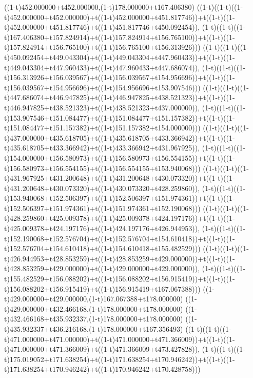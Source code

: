 ((1-t)452.000000+t452.000000,(1-t)178.000000+t167.406380)
((1-t)((1-t)((1-t)452.000000+t452.000000)+t((1-t)452.000000+t451.817746))+t((1-t)((1-t)452.000000+t451.817746)+t((1-t)451.817746+t450.092454)),                                     (1-t)((1-t)((1-t)167.406380+t157.824914)+t((1-t)157.824914+t156.765100))+t((1-t)((1-t)157.824914+t156.765100)+t((1-t)156.765100+t156.313926)))
((1-t)((1-t)((1-t)450.092454+t449.043304)+t((1-t)449.043304+t447.960433))+t((1-t)((1-t)449.043304+t447.960433)+t((1-t)447.960433+t447.686074)),                                     (1-t)((1-t)((1-t)156.313926+t156.039567)+t((1-t)156.039567+t154.956696))+t((1-t)((1-t)156.039567+t154.956696)+t((1-t)154.956696+t153.907546)))
((1-t)((1-t)((1-t)447.686074+t446.947825)+t((1-t)446.947825+t438.521323))+t((1-t)((1-t)446.947825+t438.521323)+t((1-t)438.521323+t437.000000)),                                     (1-t)((1-t)((1-t)153.907546+t151.084477)+t((1-t)151.084477+t151.157382))+t((1-t)((1-t)151.084477+t151.157382)+t((1-t)151.157382+t154.000000)))
((1-t)((1-t)((1-t)437.000000+t435.618705)+t((1-t)435.618705+t433.366942))+t((1-t)((1-t)435.618705+t433.366942)+t((1-t)433.366942+t431.967925)),                                     (1-t)((1-t)((1-t)154.000000+t156.580973)+t((1-t)156.580973+t156.554155))+t((1-t)((1-t)156.580973+t156.554155)+t((1-t)156.554155+t153.940068)))
((1-t)((1-t)((1-t)431.967925+t431.200648)+t((1-t)431.200648+t430.073320))+t((1-t)((1-t)431.200648+t430.073320)+t((1-t)430.073320+t428.259860)),                                     (1-t)((1-t)((1-t)153.940068+t152.506397)+t((1-t)152.506397+t151.974361))+t((1-t)((1-t)152.506397+t151.974361)+t((1-t)151.974361+t152.190068)))
((1-t)((1-t)((1-t)428.259860+t425.009378)+t((1-t)425.009378+t424.197176))+t((1-t)((1-t)425.009378+t424.197176)+t((1-t)424.197176+t426.944953)),                                     (1-t)((1-t)((1-t)152.190068+t152.576704)+t((1-t)152.576704+t154.610418))+t((1-t)((1-t)152.576704+t154.610418)+t((1-t)154.610418+t155.482529)))
((1-t)((1-t)((1-t)426.944953+t428.853259)+t((1-t)428.853259+t429.000000))+t((1-t)((1-t)428.853259+t429.000000)+t((1-t)429.000000+t429.000000)),                                     (1-t)((1-t)((1-t)155.482529+t156.088202)+t((1-t)156.088202+t156.915419))+t((1-t)((1-t)156.088202+t156.915419)+t((1-t)156.915419+t167.067388)))
((1-t)429.000000+t429.000000,(1-t)167.067388+t178.000000)
((1-t)429.000000+t432.466168,(1-t)178.000000+t178.000000)
((1-t)432.466168+t435.932337,(1-t)178.000000+t178.000000)
((1-t)435.932337+t436.216168,(1-t)178.000000+t167.356493)
((1-t)((1-t)((1-t)471.000000+t471.000000)+t((1-t)471.000000+t471.366009))+t((1-t)((1-t)471.000000+t471.366009)+t((1-t)471.366009+t473.427828)),                                     (1-t)((1-t)((1-t)175.019052+t171.638254)+t((1-t)171.638254+t170.946242))+t((1-t)((1-t)171.638254+t170.946242)+t((1-t)170.946242+t170.428758)))
